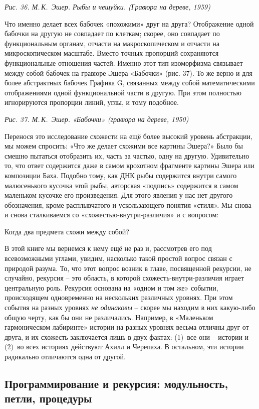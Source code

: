 \documentclass[../main.tex]{subfiles}
\begin{document}
\emph{Рис. 36. М.\,К.~Эшер. Рыбы и чешуйки. (Гравюра на дереве, 1959)}

Что именно делает всех бабочек «похожими» друг на друга? Отображение одной бабочки на другую не совпадает по клеткам; скорее, оно совпадает по функциональным органам, отчасти на макроскопическом и отчасти на микроскопическом масштабе. Вместо точных пропорций сохраняются функциональные отношения частей. Именно этот тип изоморфизма связывает между собой бабочек на гравюре Эшера «Бабочки» (рис. 37). То же верно и для более абстрактных бабочек Графика G, связанных между собой математическими отображениями одной функциональной части в другую. При этом полностью игнорируются пропорции линий, углы, и тому подобное.

\emph{Рис. 37. М.\,К.~Эшер. «Бабочки» (гравюра на дереве, 1950)}

Перенося это исследование схожести на ещё более высокий уровень абстракции, мы можем спросить: «Что же делает схожими все картины Эшера?» Было бы смешно пытаться отобразить их, часть за частью, одну на другую. Удивительно то, что ответ содержится даже в самом крохотном фрагменте картины Эшера или композиции Баха. Подобно тому, как ДНК рыбы содержится внутри самого малюсенького кусочка этой рыбы, авторская «подпись» содержится в самом маленьком кусочке его произведения. Для этого явления у нас нет другого обозначения, кроме расплывчатого и ускользающего понятия «стиля». Мы снова и снова сталкиваемся со «схожестью-внутри-различия» и с вопросом:

Когда два предмета схожи между собой?

В этой книге мы вернемся к нему ещё не раз и, рассмотрев его под всевозможными углами, увидим, насколько такой простой вопрос связан с природой разума. То, что этот вопрос возник в главе, посвященной рекурсии, не случайно, рекурсия \--- это область, в которой схожесть-внутри-различия играет центральную роль. Рекурсия основана на «одном и том же» событии, происходящем одновременно на нескольких различных уровнях. При этом события на разных уровнях \emph{не одинаковы} \--- скорее мы находим в них какую-либо общую черту, как бы они не различались. Например, в «Маленьком гармоническом лабиринте» истории на разных уровнях весьма отличны друг от друга, и их схожесть заключается лишь в двух фактах: (1)~все они \--- истории и (2)~во всех историях действуют Ахилл и Черепаха. В остальном, эти истории радикально отличаются одна от другой.


\subsection{Программирование и рекурсия: модульность, петли, процедуры}
\end{document}
